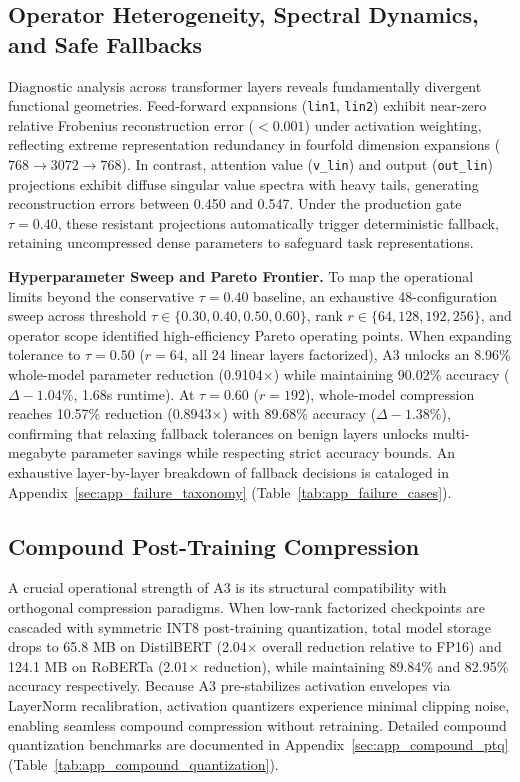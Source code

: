 \subsection{Operator Heterogeneity, Spectral Dynamics, and Safe Fallbacks}
\label{sec:operator_heterogeneity}

Diagnostic analysis across transformer layers reveals fundamentally divergent functional geometries. Feed-forward expansions (\texttt{lin1}, \texttt{lin2}) exhibit near-zero relative Frobenius reconstruction error ($< 0.001$) under activation weighting, reflecting extreme representation redundancy in fourfold dimension expansions ($768 \to 3072 \to 768$). In contrast, attention value (\texttt{v\_lin}) and output (\texttt{out\_lin}) projections exhibit diffuse singular value spectra with heavy tails, generating reconstruction errors between 0.450 and 0.547. Under the production gate $\tau = 0.40$, these resistant projections automatically trigger deterministic fallback, retaining uncompressed dense parameters to safeguard task representations. 

\textbf{Hyperparameter Sweep and Pareto Frontier.} To map the operational limits beyond the conservative $\tau=0.40$ baseline, an exhaustive 48-configuration sweep across threshold $\tau \in \{0.30, 0.40, 0.50, 0.60\}$, rank $r \in \{64, 128, 192, 256\}$, and operator scope identified high-efficiency Pareto operating points. When expanding tolerance to $\tau = 0.50$ ($r=64$, all 24 linear layers factorized), A3 unlocks an 8.96\% whole-model parameter reduction (0.9104$\times$) while maintaining 90.02\% accuracy ($\Delta -1.04\%$, 1.68s runtime). At $\tau = 0.60$ ($r=192$), whole-model compression reaches 10.57\% reduction (0.8943$\times$) with 89.68\% accuracy ($\Delta -1.38\%$), confirming that relaxing fallback tolerances on benign layers unlocks multi-megabyte parameter savings while respecting strict accuracy bounds. An exhaustive layer-by-layer breakdown of fallback decisions is cataloged in Appendix~\ref{sec:app_failure_taxonomy} (Table~\ref{tab:app_failure_cases}).

\subsection{Compound Post-Training Compression}
\label{sec:compound_compression}

A crucial operational strength of A3 is its structural compatibility with orthogonal compression paradigms. When low-rank factorized checkpoints are cascaded with symmetric INT8 post-training quantization, total model storage drops to 65.8 MB on DistilBERT (2.04$\times$ overall reduction relative to FP16) and 124.1 MB on RoBERTa (2.01$\times$ reduction), while maintaining 89.84\% and 82.95\% accuracy respectively. Because A3 pre-stabilizes activation envelopes via LayerNorm recalibration, activation quantizers experience minimal clipping noise, enabling seamless compound compression without retraining. Detailed compound quantization benchmarks are documented in Appendix~\ref{sec:app_compound_ptq} (Table~\ref{tab:app_compound_quantization}).

